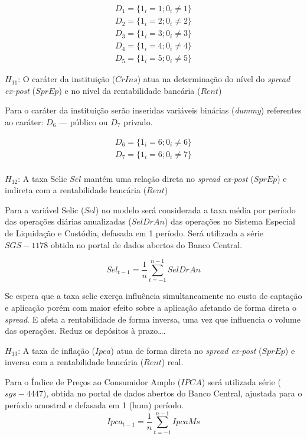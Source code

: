 \documentclass[12pt,12pt,openright,oneside,a4paper,chapter=TITLE,section=TITLE,subsection=TITLE,subsubsection=TITLE,english,french,spanish,portugues,sumario=tradicional]{abntex2}
\begin{document}
\[\begin{aligned}
D_{1} = \lbrace 1_{i} = 1 ; 0_{i} \neq 1 \rbrace \\
D_{2} = \lbrace 1_{i} = 2 ; 0_{i} \neq 2 \rbrace \\
D_{3} = \lbrace 1_{i} = 3 ; 0_{i} \neq 3 \rbrace \\
D_{4} = \lbrace 1_{i} = 4 ; 0_{i} \neq 4 \rbrace \\
D_{5} = \lbrace 1_{i} = 5 ; 0_{i} \neq 5 \rbrace
\end{aligned}\]

\(H_{11}\): O caráter da instituição (\(CrIns\)) atua na determinação do nível do
\emph{spread ex-post} (\(SprEp\)) e no nível da rentabilidade bancária (\(Rent\))

Para o caráter da instituição serão inseridas variáveis binárias (\emph{dummy}) referentes ao caráter: \(D_{6}\) --- público ou \(D_{7}\) privado.

\[\begin{aligned}
D_{6} = \lbrace 1_{i} = 6 ; 0_{i} \neq 6 \rbrace \\
D_{7} = \lbrace 1_{i} = 6 ; 0_{i} \neq 7 \rbrace \\
\end{aligned}\]

\(H_{12}\): A taxa Selic \(Sel\) mantém uma relação direta no \emph{spread ex-post} (\(SprEp\)) e indireta com a rentabilidade bancária (\(Rent\))

Para a variável Selic (\(Sel\)) no modelo será considerada a taxa média por período das operações diárias anualizadas (\(SelDrAn\)) das operações no Sistema Especial de Liquidação e Custódia, defasada em 1 período. Será utilizada a série \(SGS-1178\) obtida no portal de dados abertos do Banco Central.

\[
Sel_{t-1} = \frac{1}{n}\sum_{t=-1}^{n-1}SelDrAn
\]

Se espera que a taxa selic exerça influência simultaneamente no custo de captação e aplicação porém com maior efeito sobre a aplicação afetando de forma direta o \emph{spread}. E afeta a rentabilidade de forma inversa, uma vez que influencia o volume das operações. Reduz os depósitos à prazo\ldots{}.

\(H_{13}\): A taxa de inflação (\(Ipca\)) atua de forma direta no \emph{spread ex-post} (\(SprEp\)) e inversa com a rentabilidade bancária (\(Rent\)) real.

Para o Índice de Preços ao Consumidor Amplo (\(IPCA\)) será utilizada série (\(sgs-4447\)), obtida no portal de dados abertos do Banco Central, ajustada para o período amostral e defasada em 1 (hum) período.
\[
Ipca_{t-1} = \frac{1}{n}\sum_{t=-1}^{n-1}IpcaMs
\]
\end{document}
